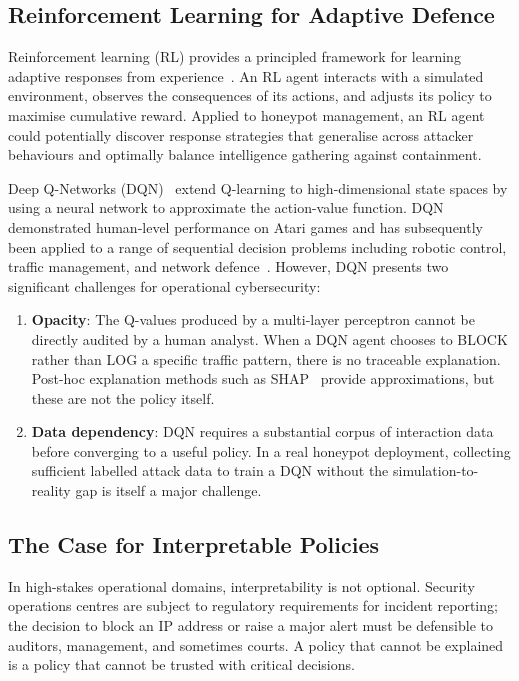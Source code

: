 \subsection{Reinforcement Learning for Adaptive Defence}

Reinforcement learning (RL) provides a principled framework for learning
adaptive responses from experience~\citep{sutton2018reinforcement}.
An RL agent interacts with a simulated environment, observes the consequences
of its actions, and adjusts its policy to maximise cumulative reward.
Applied to honeypot management, an RL agent could potentially discover
response strategies that generalise across attacker behaviours and
optimally balance intelligence gathering against containment.

Deep Q-Networks (DQN)~\citep{mnih2015humanlevel} extend Q-learning to
high-dimensional state spaces by using a neural network to approximate
the action-value function.
DQN demonstrated human-level performance on Atari games and has subsequently
been applied to a range of sequential decision problems including robotic
control, traffic management, and network defence~\citep{elderman2017adversarial}.
However, DQN presents two significant challenges for operational cybersecurity:

\begin{enumerate}
  \item \textbf{Opacity}: The Q-values produced by a multi-layer perceptron
        cannot be directly audited by a human analyst.
        When a DQN agent chooses to BLOCK rather than LOG a specific
        traffic pattern, there is no traceable explanation.
        Post-hoc explanation methods such as SHAP~\citep{lundberg2017unified}
        provide approximations, but these are not the policy itself.
  \item \textbf{Data dependency}: DQN requires a substantial corpus of
        interaction data before converging to a useful policy.
        In a real honeypot deployment, collecting sufficient labelled
        attack data to train a DQN without the simulation-to-reality
        gap is itself a major challenge.
\end{enumerate}

\subsection{The Case for Interpretable Policies}

In high-stakes operational domains, interpretability is not optional.
Security operations centres are subject to regulatory requirements for
incident reporting; the decision to block an IP address or raise a
major alert must be defensible to auditors, management, and sometimes
courts.
A policy that cannot be explained is a policy that cannot be trusted with
critical decisions.

